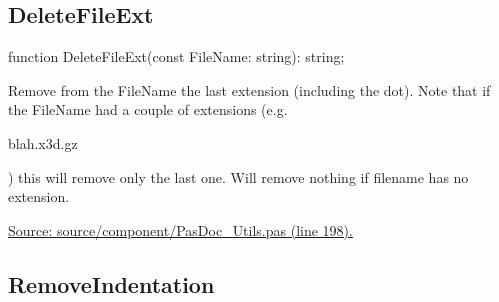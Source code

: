\documentclass{report}
\newif\ifpdf
\begin{document}
\subsection*{DeleteFileExt}
\fi
\label{PasDoc_Utils-DeleteFileExt}
\begin{list}{}{
\setlength{\itemindent}{0cm}
\setlength{\listparindent}{0cm}
\setlength{\leftmargin}{\evensidemargin}
\addtolength{\leftmargin}{\tmplength}
\settowidth{\labelsep}{X}
\addtolength{\leftmargin}{\labelsep}
\setlength{\labelwidth}{\tmplength}
}
\item[\textbf{Declaration}\hfill]
\ifpdf
\begin{flushleft}
\fi
\begin{ttfamily}
function DeleteFileExt(const FileName: string): string;\end{ttfamily}

\ifpdf
\end{flushleft}
\fi

\par
\item[\textbf{Description}]
Remove from the FileName the last extension (including the dot). Note that if the FileName had a couple of extensions (e.g. \begin{ttfamily}blah.x3d.gz\end{ttfamily}) this will remove only the last one. Will remove nothing if filename has no extension.\par
\href{https://github.com/pasdoc/pasdoc/blob/master/source/component/PasDoc_Utils.pas#L198}{Source: source/component/PasDoc{\_}Utils.pas (line 198).}

\end{list}
\ifpdf
\subsection*{\large{\textbf{RemoveIndentation}}\normalsize\hspace{1ex}\hrulefill}
\else
\end{document}
